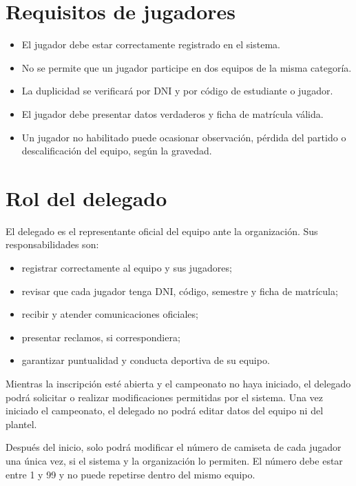 \documentclass[12pt,a4paper]{article}
\begin{document}
\section{Requisitos de jugadores}

\begin{itemize}
  \item El jugador debe estar correctamente registrado en el sistema.
  \item No se permite que un jugador participe en dos equipos de la misma categoría.
  \item La duplicidad se verificará por DNI y por código de estudiante o jugador.
  \item El jugador debe presentar datos verdaderos y ficha de matrícula válida.
  \item Un jugador no habilitado puede ocasionar observación, pérdida del partido o descalificación del equipo, según la gravedad.
\end{itemize}

\section{Rol del delegado}

El delegado es el representante oficial del equipo ante la organización. Sus responsabilidades son:

\begin{itemize}
  \item registrar correctamente al equipo y sus jugadores;
  \item revisar que cada jugador tenga DNI, código, semestre y ficha de matrícula;
  \item recibir y atender comunicaciones oficiales;
  \item presentar reclamos, si correspondiera;
  \item garantizar puntualidad y conducta deportiva de su equipo.
\end{itemize}

Mientras la inscripción esté abierta y el campeonato no haya iniciado, el delegado podrá solicitar o realizar modificaciones permitidas por el sistema. Una vez iniciado el campeonato, el delegado no podrá editar datos del equipo ni del plantel.

Después del inicio, solo podrá modificar el número de camiseta de cada jugador una única vez, si el sistema y la organización lo permiten. El número debe estar entre 1 y 99 y no puede repetirse dentro del mismo equipo.
\end{document}
